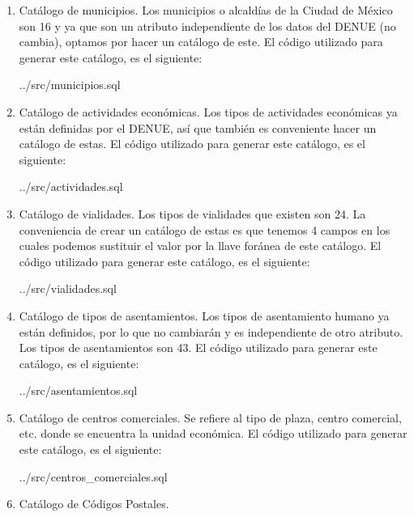 \documentclass{article}
\begin{document}
\begin{enumerate}
    \item Catálogo de municipios.
    Los municipios o alcaldías de la Ciudad de México son 16 y ya que son un
    atributo independiente de los datos del DENUE (no cambia), optamos por hacer
    un catálogo de este.
    El código utilizado para generar este catálogo, es el siguiente:
    
        {../src/municipios.sql}

    \item Catálogo de actividades económicas.
    Los tipos de actividades económicas ya están definidas por el DENUE, así que
    también es conveniente hacer un catálogo de estas.
    El código utilizado para generar este catálogo, es el siguiente:

    
    {../src/actividades.sql}

    \item Catálogo de vialidades.
    Los tipos de vialidades que existen son 24. La conveniencia de crear un
    catálogo de estas es que tenemos 4 campos en los cuales podemos sustituir el
    valor por la llave foránea de este catálogo.
    El código utilizado para generar este catálogo, es el siguiente:

    
    {../src/vialidades.sql}

    \item Catálogo de tipos de asentamientos.
    Los tipos de asentamiento humano ya están definidos, por lo que no cambiarán
    y es independiente de otro atributo. Los tipos de asentamientos son 43.
    El código utilizado para generar este catálogo, es el siguiente:

    
    {../src/asentamientos.sql}

    \item Catálogo de centros comerciales.
    Se refiere al tipo de plaza, centro comercial, etc. donde se encuentra la
    unidad económica.
    El código utilizado para generar este catálogo, es el siguiente:

    
    {../src/centros_comerciales.sql}

    \item Catálogo de Códigos Postales.


\end{enumerate}
\end{document}

